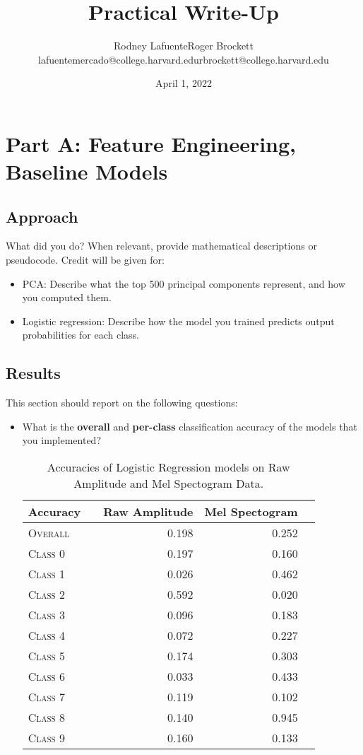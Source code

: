 \documentclass[11pt]{article}
\title{Practical Write-Up}
\author{Rodney Lafuente\hspace{4cm}Roger Brockett \\ 
lafuentemercado@college.harvard.edu\hspace{1cm}rbrockett@college.harvard.edu}
\date{April 1, 2022}
\begin{document}
\maketitle{}

\section{Part A: Feature Engineering, Baseline Models}

\subsection{Approach}

What did you do? When relevant, provide mathematical descriptions or pseudocode. Credit will be given for:

  \begin{itemize}
  \item PCA:  Describe what the top 500 principal components represent, and how you computed them.
  \item Logistic regression: Describe how the model you trained predicts output probabilities for each class.
  \end{itemize}

\subsection{Results}

This section should report on the following questions: 

\begin{itemize}
\item  What is the \textbf{overall} and \textbf{per-class} classification accuracy of the models that you implemented?
\begin{table}[ht]
\centering
\begin{tabular}{llrrr}
    \toprule
    Accuracy &  & Raw Amplitude & Mel Spectogram \\
    \midrule
    \textsc{Overall} & & 0.198 & 0.252 \\
    \textsc{Class 0} & & 0.197 & 0.160 \\
    \textsc{Class 1} & & 0.026 & 0.462 \\
    \textsc{Class 2} & & 0.592 & 0.020 \\
    \textsc{Class 3} & & 0.096 & 0.183 \\
    \textsc{Class 4} & & 0.072 & 0.227 \\
    \textsc{Class 5} & & 0.174 & 0.303 \\
    \textsc{Class 6} & & 0.033 & 0.433 \\
    \textsc{Class 7} & & 0.119 & 0.102 \\
    \textsc{Class 8} & & 0.140 & 0.945 \\
    \textsc{Class 9} & & 0.160 & 0.133 \\
    \bottomrule
\end{tabular}
\caption{\label{tab:rf_results} Accuracies of Logistic Regression models on Raw Amplitude and Mel Spectogram Data.}
\end{table}
\end{itemize}
\end{document}
